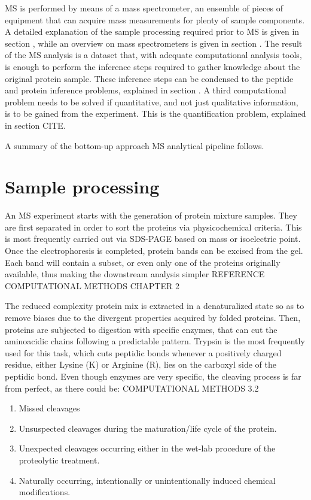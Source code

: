 \documentclass[11pt, a4paper]{report}
\begin{document}
MS is performed by means of a mass spectrometer, an ensemble of pieces of equipment that can acquire mass measurements for plenty of sample components. A detailed explanation of the sample processing required prior to MS is given in section \label{sec:sample processing}, while an overview on mass spectrometers is given in section \label{sec:the mass spectrometer}. The result of the MS analysis is a dataset that, with adequate computational analysis tools, is enough to perform the inference steps required to gather knowledge about the original protein sample. These inference steps can be condensed to the peptide and protein inference problems, explained in section \label{sec:peptide and protein inference}. A third computational problem needs to be solved if quantitative, and not just qualitative information, is to be gained from the experiment. This is the quantification problem, explained in section \label{sec:quantification} CITE.

A summary of the bottom-up approach MS analytical pipeline follows.


\section{Sample processing}
\label{sec:sample_processing}

An \ac{MS} experiment starts with the generation of protein mixture samples. They are first separated in order to sort the proteins via physicochemical criteria. This is most frequently carried out via SDS-PAGE based on mass or isoelectric point. Once the electrophoresis is completed, protein bands can be excised from the gel. Each band will contain a subset, or even only one of the proteins originally available, thus making the downstream analysis simpler REFERENCE COMPUTATIONAL METHODS CHAPTER 2

The reduced complexity protein mix is extracted in a denaturalized state so as to remove biases due to the divergent properties acquired by folded proteins. Then, proteins are subjected to digestion with specific enzymes, that can cut the aminoacidic chains following a predictable pattern. Trypsin is the most frequently used for this task, which cuts peptidic bonds whenever a positively charged residue, either Lysine (K) or Arginine (R), lies on the carboxyl side of the peptidic bond. Even though enzymes are very specific, the cleaving process is far from perfect, as there could be: COMPUTATIONAL METHODS 3.2

\begin{enumerate}

\item Missed cleavages \label{item:missed_cleavages}

\item Unsuspected cleavages during the maturation/life cycle of the protein.

\item Unexpected cleavages occurring either in the wet-lab procedure of the proteolytic treatment.

\item Naturally occurring, intentionally or unintentionally induced chemical modifications.

\end{enumerate}
\end{document}
